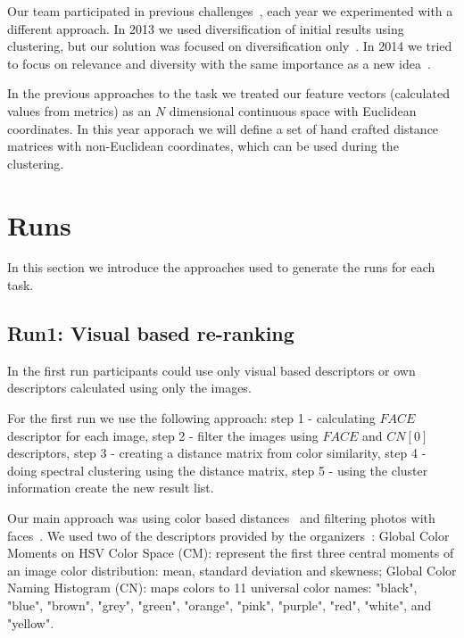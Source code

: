 \documentclass{acm_proc_article-me}
\begin{document}
Our team participated in previous challenges~\cite{szHucs2013bmemtm,Paroczi2014}, each year we experimented with a different approach. In 2013 we used diversification of initial results using clustering, but our solution was focused on diversification only~\cite{szHucs2013bmemtm}. In 2014 we tried to focus on relevance and diversity with the same importance as a new idea~\cite{Paroczi2014}.

In the previous approaches to the task we treated our feature vectors (calculated values from metrics) as an $N$ dimensional continuous space with Euclidean coordinates. In this year apporach we will define a set of hand crafted distance matrices with non-Euclidean coordinates, which can be used during the clustering. 

\section{Runs}

In this section we introduce the approaches used to generate the runs for each task.

\subsection{Run1: Visual based re-ranking}\label{run1}
In the first run participants could use only visual based descriptors or own descriptors calculated using only the images.

For the first run we use the following approach: step 1 - calculating $FACE$ descriptor for each image, step 2 - filter the images using $FACE$ and $CN[0]$ descriptors, step 3 - creating a distance matrix from color similarity, step 4 - doing spectral clustering using the distance matrix, step 5 - using the cluster information create the new result list.

Our main approach was using color based distances~\cite{Datta2008,Paramita2010} and filtering photos with faces~\cite{szHucs2013bmemtm,Paroczi2014}. We used two of the descriptors provided by the organizers~\cite{Task2015}: Global Color Moments on HSV Color Space (CM): represent the first three central moments of an image color distribution: mean, standard deviation and skewness; 
Global Color Naming Histogram (CN): maps colors to 11 universal color names: "black", "blue", "brown", "grey", "green", "orange", "pink", "purple", "red", "white", and "yellow".

\end{document}
